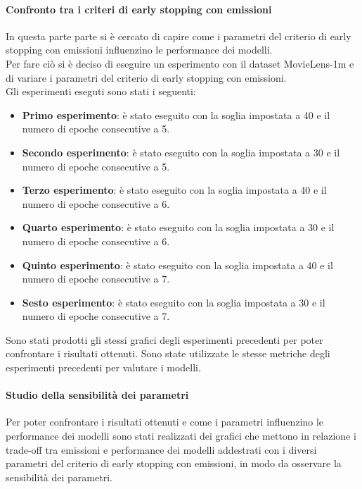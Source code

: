 \paragraph{Confronto tra i criteri di early stopping con emissioni}
In questa parte parte si è cercato di capire come i parametri del criterio di early stopping con emissioni influenzino le performance dei modelli.\\
Per fare ciò si è deciso di eseguire un esperimento con il dataset MovieLens-1m e di variare i parametri del criterio di early stopping con emissioni.\\
Gli esperimenti eseguti sono stati i seguenti:
\begin{itemize}
    \item \textbf{Primo esperimento}: è stato eseguito con la soglia impostata a 40 e il numero di epoche consecutive a 5.
    \item \textbf{Secondo esperimento}: è stato eseguito con la soglia impostata a 30 e il numero di epoche consecutive a 5.
    \item \textbf{Terzo esperimento}: è stato eseguito con la soglia impostata a 40 e il numero di epoche consecutive a 6.
    \item \textbf{Quarto esperimento}: è stato eseguito con la soglia impostata a 30 e il numero di epoche consecutive a 6.
    \item \textbf{Quinto esperimento}: è stato eseguito con la soglia impostata a 40 e il numero di epoche consecutive a 7.
    \item \textbf{Sesto esperimento}: è stato eseguito con la soglia impostata a 30 e il numero di epoche consecutive a 7.
\end{itemize}

\noindent Sono stati prodotti gli stessi grafici degli esperimenti precedenti per poter confrontare i risultati ottenuti. Sono state utilizzate le stesse metriche degli esperimenti precedenti per valutare i modelli.

\paragraph{Studio della sensibilità dei parametri}
\noindent Per poter confrontare i risultati ottenuti e come i parametri influenzino le performance dei modelli sono stati realizzati dei grafici che mettono in relazione i trade-off tra emissioni e performance dei modelli addestrati con i diversi parametri del criterio di early stopping con emissioni, in modo da osservare la sensibilità dei parametri.
